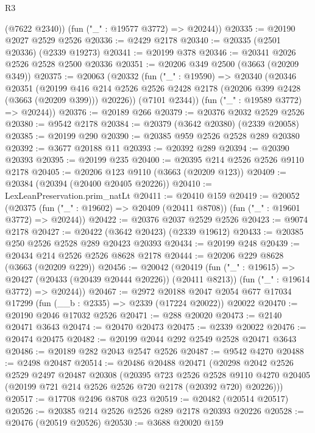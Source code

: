 \begin{lexlean}{R3}
\begin{coremodule}
        (@7622 @2340))
      (fun ("_" : @19577 @3772) => @20244))
@20335 := @20190 @2027 @2529 @2526
@20336 := @2429 @2178
@20340 := @20335 (@2501 @20336) (@2339 @19273)
@20341 := @20199 @378
@20346 := @20341 @2026 @2526 @2528 @2500 @20336
@20351 := @20206 @349 @2500 (@3663 (@20209 @349))
@20375 := @20063
    (@20332
      (fun ("_" : @19590) =>
      @20340
        (@20346
          @20351
          (@20199
            @416
            @214
            @2526
            @2526
            @2428
            @2178
            (@20206 @399 @2428 (@3663 (@20209 @399)))
            @20226))
        (@7101 @2344))
      (fun ("_" : @19589 @3772) => @20244))
@20376 := @20189 @266
@20379 := @20376 @2032 @2529 @2526
@20380 := @9542 @2178
@20384 := @20379 (@3642 @20380) (@2339 @20058)
@20385 := @20199 @290
@20390 := @20385 @959 @2526 @2528 @289 @20380
@20392 := @3677 @20188 @11
@20393 := @20392 @289
@20394 := @20390 @20393
@20395 := @20199 @235
@20400 := @20395 @214 @2526 @2526 @9110 @2178
@20405 := @20206 @123 @9110 (@3663 (@20209 @123))
@20409 := @20384 (@20394 (@20400 @20405 @20226))
@20410 := LexLeanPreservation.prim_natLt
@20411 := @20410 @159
@20419 := @20052
    (@20375 (fun ("_" : @19602) => @20409 (@20411 @8708)) (fun ("_" : @19601 @3772) => @20244))
@20422 := @20376 @2037 @2529 @2526
@20423 := @9074 @2178
@20427 := @20422 (@3642 @20423) (@2339 @19612)
@20433 := @20385 @250 @2526 @2528 @289 @20423 @20393
@20434 := @20199 @248
@20439 := @20434 @214 @2526 @2526 @8628 @2178
@20444 := @20206 @229 @8628 (@3663 (@20209 @229))
@20456 := @20042
    (@20419
      (fun ("_" : @19615) => @20427 (@20433 (@20439 @20444 @20226)) (@20411 @8213))
      (fun ("_" : @19614 @3772) => @20244))
@20467 := @2972
    @20188
    @2047
    @2054
    @677
    @17034
    @17299
    (fun (__b : @2335) => @2339 (@17224 @20022))
    @20022
@20470 := @20190 @2046 @17032 @2526
@20471 := @288 @20020
@20473 := @2140 @20471 @3643
@20474 := @20470 @20473
@20475 := @2339 @20022
@20476 := @20474 @20475
@20482 := @20199 @2044 @292 @2549 @2528 @20471 @3643
@20486 := @20189 @282 @2043 @2547 @2526
@20487 := @9542 @4270
@20488 := @2498 @20487
@20514 := @20486
    @20488
    @20471
    (@20298
      @2042
      @2526
      @2529
      @2497
      @20487
      @20308
      (@20395
        @723
        @2526
        @2528
        @9110
        @4270
        @20405
        (@20199 @721 @214 @2526 @2526 @720 @2178 (@20392 @720) @20226)))
@20517 := @17708 @2496 @8708 @23
@20519 := @20482 (@20514 @20517)
@20526 := @20385 @214 @2526 @2526 @289 @2178 @20393 @20226
@20528 := @20476 (@20519 @20526)
@20530 := @3688 @20020 @159

\end{coremodule}
\end{lexlean}
